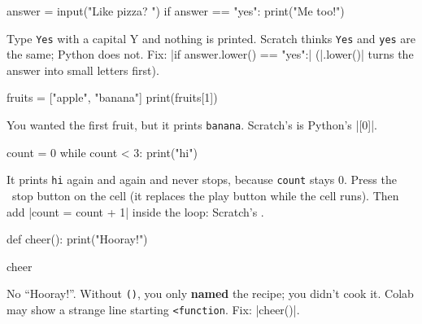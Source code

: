 \noindent\begin{minipage}[c]{0.55\linewidth}
\begin{code}
answer = input("Like pizza? ")
if answer == "yes":
    print("Me too!")
\end{code}
\end{minipage}\hfill
\begin{minipage}[c]{0.42\linewidth}\small\raggedright
Type \texttt{Yes} with a capital Y and nothing is printed. Scratch thinks \texttt{Yes} and \texttt{yes} are the same; Python does not. Fix: \py|if answer.lower() == "yes":| (\py|.lower()| turns the answer into small letters first).
\end{minipage}

\noindent\begin{minipage}[c]{0.55\linewidth}
\begin{code}
fruits = ["apple", "banana"]
print(fruits[1])
\end{code}
\end{minipage}\hfill
\begin{minipage}[c]{0.42\linewidth}\small\raggedright
You wanted the first fruit, but it prints \texttt{banana}. Scratch's  is Python's \py|[0]|.
\end{minipage}

\noindent\begin{minipage}[c]{0.55\linewidth}
\begin{code}
count = 0
while count < 3:
    print("hi")
\end{code}
\end{minipage}\hfill
\begin{minipage}[c]{0.42\linewidth}\small\raggedright
It prints \texttt{hi} again and again and never stops, because \texttt{count} stays 0. Press the \stopbtn\ stop button on the cell (it replaces the play button while the cell runs). Then add \py|count = count + 1| inside the loop: Scratch's .
\end{minipage}

\noindent\begin{minipage}[c]{0.55\linewidth}
\begin{code}
def cheer():
    print("Hooray!")

cheer
\end{code}
\end{minipage}\hfill
\begin{minipage}[c]{0.42\linewidth}\small\raggedright
No ``Hooray!''. Without \texttt{()}, you only \textbf{named} the recipe; you didn't cook it. Colab may show a strange line starting \texttt{<function}. Fix: \py|cheer()|.
\end{minipage}

